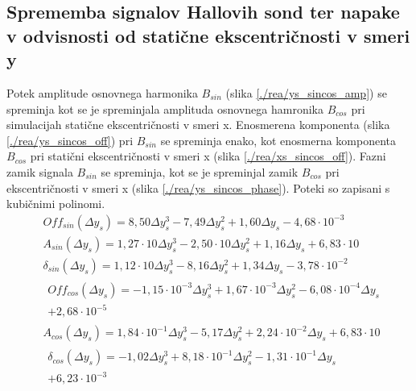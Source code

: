 \subsection{Sprememba signalov Hallovih sond ter napake v odvisnosti od statične ekscentričnosti v smeri y}
Potek amplitude osnovnega harmonika $B_{sin}$ (slika \ref{./rea/ys_sincos_amp}) se spreminja kot se je spreminjala amplituda osnovnega hamronika $B_{cos}$ pri simulacijah statične ekscentričnosti v smeri x.  Enosmerena komponenta (slika \ref{./rea/ys_sincos_off}) pri $B_{sin}$ se spreminja enako, kot enosmerna komponenta $B_{cos}$ pri statični ekscentričnosti v smeri x (slika \ref{./rea/xs_sincos_off}).  Fazni zamik signala $B_{sin}$ se spreminja, kot se je spreminjal zamik  $B_{cos}$ pri ekscentričnosti v smeri x (slika \ref{./rea/ys_sincos_phase}). Poteki so zapisani s kubičnimi polinomi.
\begin{eqnarray}
&Off_{sin}(\Delta y_s) =8,50\Delta y_s^{3}-7,49\Delta y_s^{2}+1,60\Delta y_s-4,68\cdot 10^{-3} \\                                        
&A_{sin}(\Delta y_s) =1,27\cdot 10\Delta y_s^{3}-2,50\cdot 10\Delta y_s^{2}+1,16\Delta y_s+6,83\cdot 10 \\                               
&\delta_{sin}(\Delta y_s) =1,12\cdot 10\Delta y_s^{3}-8,16\Delta y_s^{2}+1,34\Delta y_s-3,78\cdot 10^{-2} \\                              
&\begin{split}Off_{cos}(\Delta y_s) =-1,15\cdot 10^{-3}\Delta y_s^{3}+1,67\cdot 10^{-3}\Delta y_s^{2}-6,08\cdot 10^{-4}\Delta y_s\\+2,68\cdot 10^{-5}\end{split} \\
&A_{cos}(\Delta y_s) =1,84\cdot 10^{-1}\Delta y_s^{3}-5,17\Delta y_s^{2}+2,24\cdot 10^{-2}\Delta y_s+6,83\cdot 10 \\                     
&\begin{split}\delta_{cos}(\Delta y_s) =-1,02\Delta y_s^{3}+8,18\cdot 10^{-1}\Delta y_s^{2}-1,31\cdot 10^{-1}\Delta y_s\\+6,23\cdot 10^{-3} \end{split}
\end{eqnarray}

